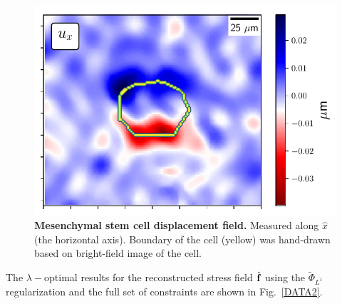 \documentclass[aps,prl,reprint,twocolumn,groupedaddress,showpacs]{revtex4}
\def\f{{\bf f}}
\begin{document}
\begin{figure}
\includegraphics[width=\linewidth]{fig8}
\caption{\textbf{Mesenchymal stem cell displacement field.} Measured
 along $\hat{x}$ (the horizontal axis). Boundary of the cell (yellow) was hand-drawn
based on bright-field image of the cell.
}
\label{DATA}
\end{figure}
%
The $\lambda-$optimal results for the reconstructed stress field
$\hat{\f}$ using the $\tilde{\Phi}_{L^{1}}$ regularization and the
full set of constraints are shown in Fig.~\ref{DATA2}.
\end{document}

